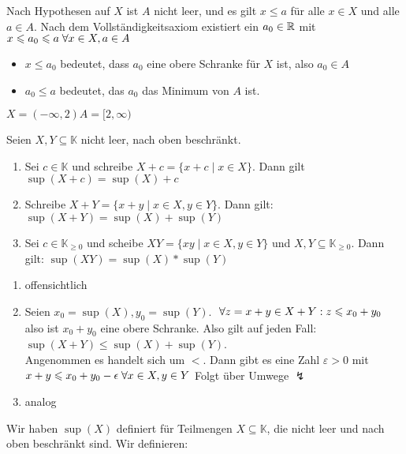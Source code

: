 \documentclass[main.tex]{subfiles}
\begin{document}
\begin{Beweis}
  Nach Hypothesen auf $X$ ist $A$ nicht leer, und es gilt $x \leq a$ für alle $x \in X$ und alle $a \in A$. Nach dem Vollständigkeitsaxiom existiert ein $a_0 \in \mathbb{R}$ mit $x \leqslant a_0 \leqslant a \;\forall x \in X, a \in A$
  \begin{itemize}
    \item $x \leq a_0$ bedeutet, dass $a_0$ eine obere Schranke für $X$ ist, also $a_0 \in A$
    \item $ a_0 \leq a$ bedeutet, das $a_0$ das Minimum von $A$ ist.
  \end{itemize}
\end{Beweis}

\begin{Beispiel}
  $X = (-\infty,2) A = [2,\infty)$
\end{Beispiel}

\begin{Theorem}
  Seien $X,Y \subseteq \mathbb{K}$ nicht leer, nach oben beschränkt.
  \begin{enumerate}
    \item Sei $c \in \mathbb{K}$ und schreibe $X+c= \{x+c \mid x \in X\}$. Dann gilt $\sup(X+c)=\sup(X)+c$
    \item Schreibe $X+Y = \{x+y \mid x \in X, y \in Y\}$. Dann gilt: $\sup(X+Y) = \sup(X)+\sup(Y)$
    \item Sei $c \in \mathbb{K}_{\geq 0}$ und scheibe $XY = \{xy \mid x \in X, y \in Y\}$ und $X,Y \subseteq \mathbb{K}_{\geq 0}$. Dann gilt: $\sup(XY) = \sup(X)*\sup(Y)$
  \end{enumerate}
\end{Theorem}

\begin{Beweis}
  \begin{enumerate}
    \item offensichtlich
    \item Seien $x_0 = \sup(X),y_0 = \sup(Y)$. $\;\forall z = x+y \in X+Y : z\leqslant x_0 + y_0$ also ist $x_0+y_0$ eine obere Schranke. Also gilt auf jeden Fall: $\sup(X+Y) \leq \sup(X)+\sup(Y)$.\\
    Angenommen es handelt sich um $<$. Dann gibt es eine Zahl $\varepsilon > 0$ mit $x+y \leqslant x_0 +y_0 - \epsilon \;\forall x \in X, y \in Y$ Folgt über Umwege $\lightning$
    \item analog
  \end{enumerate}
\end{Beweis}

Wir haben $\sup(X)$ definiert für Teilmengen $X \subseteq \mathbb{K}$, die nicht leer und nach oben beschränkt sind. Wir definieren:
\end{document}

